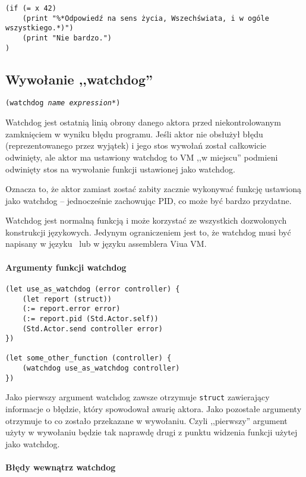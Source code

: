 \begin{lstlisting}
(if (= x 42)
    (print "%*Odpowiedź na sens życia, Wszechświata, i w ogóle wszystkiego.*)")
    (print "Nie bardzo.")
)
\end{lstlisting}

\subsection{Wywołanie ,,watchdog''}

\texttt{(watchdog \emph{name} \emph{expression}*)}
\newline

Watchdog jest ostatnią linią obrony danego aktora przed niekontrolowanym zamknięciem w wyniku błędu programu.
Jeśli aktor nie obsłużył błędu (reprezentowanego przez wyjątek) i jego stos wywołań został całkowicie
odwinięty, ale aktor ma ustawiony watchdog to VM ,,w miejscu'' podmieni odwinięty stos na wywołanie funkcji
ustawionej jako watchdog.

Oznacza to, że aktor zamiast zostać zabity zacznie wykonywać funkcję ustawioną jako watchdog -- jednocześnie
zachowując PID, co może być bardzo przydatne.

Watchdog jest normalną funkcją i może korzystać ze wszystkich dozwolonych konstrukcji językowych.
Jedynym ograniczeniem jest to, że watchdog musi być napisany w języku \ViuAct\ lub w języku assemblera Viua VM.

\paragraph*{Argumenty funkcji watchdog}

\begin{lstlisting}
(let use_as_watchdog (error controller) {
    (let report (struct))
    (:= report.error error)
    (:= report.pid (Std.Actor.self))
    (Std.Actor.send controller error)
})

(let some_other_function (controller) {
    (watchdog use_as_watchdog controller)
})
\end{lstlisting}

Jako pierwszy argument watchdog zawsze otrzymuje \texttt{struct} zawierający informacje o błędzie, który
spowodował awarię aktora. Jako pozostałe argumenty otrzymuje to co zostało przekazane w wywołaniu.
Czyli ,,pierwszy'' argument użyty w wywołaniu będzie tak naprawdę drugi z punktu widzenia funkcji użytej jako
watchdog.

\paragraph*{Błędy wewnątrz watchdog}

